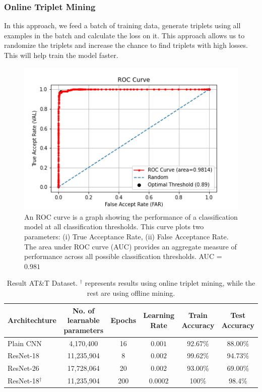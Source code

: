 \documentclass[
12pt,
tightenlines,
aps,
prb,
twocolumn,
superscriptaddress,
longbibliography,
floatfix
]{revtex4-2}
\newcounter{para}
\begin{document}
\subsubsection{Online Triplet Mining} 
In this approach, we feed a batch of training data, generate triplets using all examples in the batch and calculate the loss on it. This approach allows us to randomize the triplets and increase the chance to find triplets with high losses. This will help train the model faster.
\begin{figure}[h!]
    \includegraphics[clip=true,width=\columnwidth]{ROC_curve_ATT_test_dataset.png}
    \caption{An ROC curve is a graph showing the performance of a classification model at all classification thresholds. This curve plots two parameters: (i) True Acceptance Rate, (ii) False Acceptance Rate. The area under ROC curve (AUC) provides an aggregate measure of performance across all possible classification thresholds. AUC = $0.981$} 
     \label{fig:eer_roc}
\end{figure}

\begin{table}[t]
    \begin{center}
    \caption{Result AT\&T Dataset. $^\dagger$ represents results using online triplet mining, while the rest are using offline mining.}
    \label{tab:att}
    \begin{tabular}{l|c|c|c|c|c}
    \hline
    \textbf{Architechture} & \textbf{No. of learnable parameters} & \textbf{Epochs} & \textbf{Learning Rate} & \textbf{Train Accuracy} & \textbf{Test Accuracy} \\
    \hline \hline
    Plain CNN     & 4,170,400                   & 16     & $0.001$         & 92.67\%        & 88.00\%       \\
    ResNet-18     & 11,235,904                  & 8      & $0.002$         & 99.62\%        & 94.73\%       \\
    ResNet-26     & 17,728,064                  & 20     & $0.002$         & 93.00\%        & 69.00\%       \\
    {ResNet-18}$^\dagger$     & 11,235,904                  & 200    & $0.0002$          & 100\%          & 98.4\%   \\
    \hline
    \end{tabular}
    \end{center}
\end{table}
\end{document}
